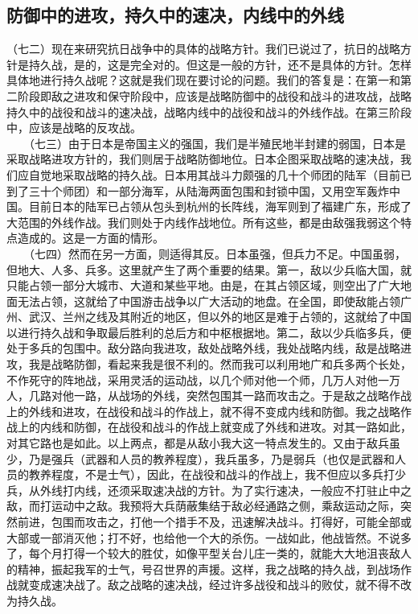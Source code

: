\documentclass[cn,11pt,chinese]{elegantbook}
\def\myformat#1{\hfil\hfil #1}
\begin{document}
\subsection*{\myformat{防御中的进攻，持久中的速决，内线中的外线}}
（七二）现在来研究抗日战争中的具体的战略方针。我们已说过了，抗日的战略方针是持久战，是的，这是完全对的。但这是一般的方针，还不是具体的方针。怎样具体地进行持久战呢？这就是我们现在要讨论的问题。我们的答复是：在第一和第二阶段即敌之进攻和保守阶段中，应该是战略防御中的战役和战斗的进攻战，战略持久中的战役和战斗的速决战，战略内线中的战役和战斗的外线作战。在第三阶段中，应该是战略的反攻战。\\
　　（七三）由于日本是帝国主义的强国，我们是半殖民地半封建的弱国，日本是采取战略进攻方针的，我们则居于战略防御地位。日本企图采取战略的速决战，我们应自觉地采取战略的持久战。日本用其战斗力颇强的几十个师团的陆军（目前已到了三十个师团）和一部分海军，从陆海两面包围和封锁中国，又用空军轰炸中国。目前日本的陆军已占领从包头到杭州的长阵线，海军则到了福建广东，形成了大范围的外线作战。我们则处于内线作战地位。所有这些，都是由敌强我弱这个特点造成的。这是一方面的情形。\\
　　（七四）然而在另一方面，则适得其反。日本虽强，但兵力不足。中国虽弱，但地大、人多、兵多。这里就产生了两个重要的结果。第一，敌以少兵临大国，就只能占领一部分大城市、大道和某些平地。由是，在其占领区域，则空出了广大地面无法占领，这就给了中国游击战争以广大活动的地盘。在全国，即使敌能占领广州、武汉、兰州之线及其附近的地区，但以外的地区是难于占领的，这就给了中国以进行持久战和争取最后胜利的总后方和中枢根据地。第二，敌以少兵临多兵，便处于多兵的包围中。敌分路向我进攻，敌处战略外线，我处战略内线，敌是战略进攻，我是战略防御，看起来我是很不利的。然而我可以利用地广和兵多两个长处，不作死守的阵地战，采用灵活的运动战，以几个师对他一个师，几万人对他一万人，几路对他一路，从战场的外线，突然包围其一路而攻击之。于是敌之战略作战上的外线和进攻，在战役和战斗的作战上，就不得不变成内线和防御。我之战略作战上的内线和防御，在战役和战斗的作战上就变成了外线和进攻。对其一路如此，对其它路也是如此。以上两点，都是从敌小我大这一特点发生的。又由于敌兵虽少，乃是强兵（武器和人员的教养程度），我兵虽多，乃是弱兵（也仅是武器和人员的教养程度，不是士气），因此，在战役和战斗的作战上，我不但应以多兵打少兵，从外线打内线，还须采取速决战的方针。为了实行速决，一般应不打驻止中之敌，而打运动中之敌。我预将大兵荫蔽集结于敌必经通路之侧，乘敌运动之际，突然前进，包围而攻击之，打他一个措手不及，迅速解决战斗。打得好，可能全部或大部或一部消灭他；打不好，也给他一个大的杀伤。一战如此，他战皆然。不说多了，每个月打得一个较大的胜仗，如像平型关台儿庄一类的，就能大大地沮丧敌人的精神，振起我军的士气，号召世界的声援。这样，我之战略的持久战，到战场作战就变成速决战了。敌之战略的速决战，经过许多战役和战斗的败仗，就不得不改为持久战。\\
\end{document}
